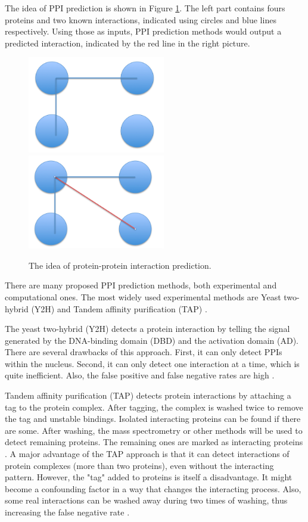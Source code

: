 The idea of PPI prediction is shown in Figure \ref{fig:ppi_pred}. The left part contains fours proteins and two known interactions, indicated using circles and blue lines respectively. Using those as inputs, PPI prediction methods would output a predicted interaction, indicated by the red line in the right picture. 
\begin{figure}[h!]
\begin{center}
\includegraphics[width=6cm]{img/know_ppi.png}
\includegraphics[width=6cm]{img/predict_ppi.png}
\end{center}
\caption{The idea of protein-protein interaction prediction.  \label{fig:ppi_pred}}
\end{figure}

There are many proposed PPI prediction methods, both experimental and computational ones. The most widely used experimental methods are Yeast two-hybrid (Y2H) \cite{fields1989novel} and Tandem affinity purification (TAP) \cite{suter2008two}. 

The yeast two-hybrid (Y2H) detects a protein interaction by telling the signal generated by the DNA-binding domain (DBD) and the activation domain (AD). There are several drawbacks of this approach. First, it can only detect PPIs within the nucleus. Second, it can only detect one interaction at a time, which is quite inefficient. Also, the false positive and false negative rates are high \cite{stephens2000use, semple2002jury}.

Tandem affinity purification (TAP) detects protein interactions by attaching a tag to the protein complex. After tagging, the complex is washed twice to remove the tag and unstable bindings. Isolated interacting proteins can be found if there are some. After washing, the mass spectrometry or other methods will be used to detect remaining proteins. The remaining ones are marked as interacting proteins \cite{rigaut1999generic}. A major advantage of the TAP approach is that it can detect interactions of protein complexes (more than two proteins), even without the interacting pattern. However, the "tag" added to proteins is itself a disadvantage. It might become a confounding factor in a way that changes the interacting process. Also, some real interactions can be washed away during two times of washing, thus increasing the false negative rate \cite{jessulat2011recent}.

